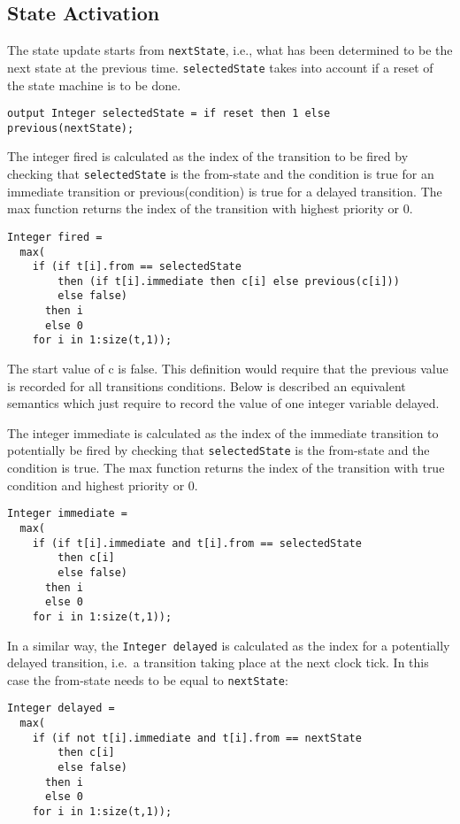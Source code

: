 \subsection{State Activation}\label{state-activation}

The state update starts from \lstinline!nextState!, i.e., what has been determined to be the next state at the previous time.
\lstinline!selectedState! takes into account if a reset of the state machine is to be done.

\begin{lstlisting}[language=modelica]
output Integer selectedState = if reset then 1 else previous(nextState);
\end{lstlisting}
The integer fired is calculated as the index of the transition to be
fired by checking that \lstinline!selectedState! is the from-state and the condition
is true for an immediate transition or previous(condition) is true for a
delayed transition. The max function returns the index of the transition
with highest priority or 0.

\begin{lstlisting}[language=modelica]
Integer fired =
  max(
    if (if t[i].from == selectedState
        then (if t[i].immediate then c[i] else previous(c[i]))
        else false)
      then i
      else 0
    for i in 1:size(t,1));
\end{lstlisting}
The start value of c is false. This definition would require that the
previous value is recorded for all transitions conditions. Below is
described an equivalent semantics which just require to record the value
of one integer variable delayed.

The integer immediate is calculated as the index of the immediate
transition to potentially be fired by checking that \lstinline!selectedState! is the
from-state and the condition is true. The max function returns the index
of the transition with true condition and highest priority or 0.

\begin{lstlisting}[language=modelica]
Integer immediate =
  max(
    if (if t[i].immediate and t[i].from == selectedState
        then c[i]
        else false)
      then i
      else 0
    for i in 1:size(t,1));
\end{lstlisting}

In a similar way, the \lstinline!Integer delayed! is calculated as the index for a
potentially delayed transition, i.e.\ a transition taking place at the
next clock tick. In this case the from-state needs to be equal to
\lstinline!nextState!:
\begin{lstlisting}[language=modelica]
Integer delayed =
  max(
    if (if not t[i].immediate and t[i].from == nextState
        then c[i]
        else false)
      then i
      else 0
    for i in 1:size(t,1));
\end{lstlisting}

